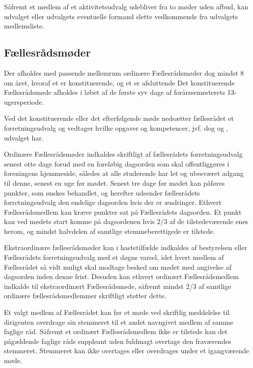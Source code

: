 \begin{list}
\item  Såfremt et medlem af et aktivitetsudvalg udebliver fra to møder uden afbud, kan udvalget eller udvalgets eventuelle formand slette vedkommende fra udvalgets medlemsliste.


\subsection{Fællesrådsmøder}
\label{S:kap:FRmoeder}
\item Der afholdes med passende mellemrum ordinære Fællesrådsmøder dog mindst 8 om året, hvoraf et er konstituerende, og et er afsluttende Det konstituerende Fællesrådsmøde afholdes i løbet af de første syv dage af forårssemesterets 13-ugersperiode.

\item  Ved det konstituerende eller det efterfølgende møde nedsætter fællesrådet et forretningsudvalg og vedtager hvilke opgaver og kompetencer, jvf. dog  og , udvalget har.

\item  \label{S:FRmoeder:indkaldelse} Ordinære Fællesrådsmøder indkaldes skriftligt af fællesrådets forretningsudvalg senest otte dage forud med en foreløbig dagsorden som skal offentliggøres i foreningens hjemmeside, således at alle studerende har let og ubesværet adgang til denne, senest en uge før mødet. Senest tre dage før mødet kan påføres punkter, som ønskes behandlet, og herefter udsender fællesrådets forretningsudvalg den endelige dagsorden hvis der er ændringer. Ethvert Fællesrådsmedlem kan kræve punkter sat på Fællesrådets dagsorden. Et punkt kan ved mødets start komme på dagsordenen hvis 2/3 af de tilstedeværende enes herom, og mindst halvdelen af samtlige stemmeberettigede er tilstede.                                     
                             
\item \label{S:FRmoeder:ekstra} Ekstraordinære fællesrådsmøder kan i hastetilfælde indkaldes af bestyrelsen eller Fællesrådets forretningsudvalg med et døgns varsel, idet hvert medlem af Fællesrådet så vidt muligt skal modtage besked om mødet med angivelse af dagsorden inden denne frist. Desuden kan ethvert ordinært Fællesrådsmedlem indkalde til ekstraordinært Fællesrådsmøde, såfremt mindst 2/3 af samtlige ordinære fællesrådsmedlemmer skriftligt støtter dette.

\item  Et valgt medlem af Fællesrådet kan før et møde ved skriftlig meddelelse til dirigenten overdrage sin stemmeret til et andet navngivet medlem af samme faglige råd. Såfremt et ordinært Fællesrådsmedlem ikke er tilstede kan det pågældende faglige råds suppleant uden fuldmagt overtage den fraværendes stemmeret. Stemmeret kan ikke overtages eller overdrages under et igangværende møde.


\end{list}
